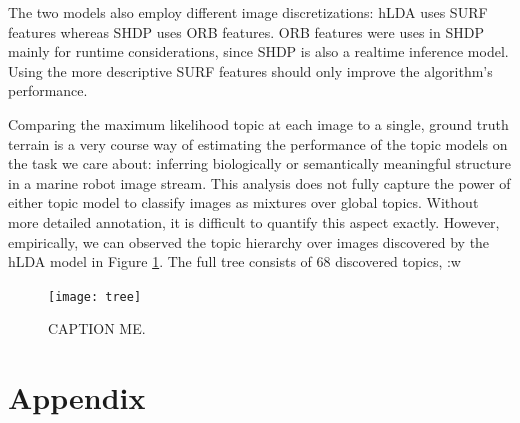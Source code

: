 \documentclass{article}
\begin{document}
The two models also employ different image discretizations: hLDA uses SURF features whereas SHDP uses ORB features. ORB features were uses in SHDP mainly for runtime considerations, since SHDP is also a realtime inference model. Using the more descriptive SURF features should only improve the algorithm's performance. 

Comparing the maximum likelihood topic at each image to a single, ground truth terrain is a very course way of estimating the performance of the topic models on the task we care about: inferring biologically or semantically meaningful structure in a marine robot image stream. This analysis does not fully capture the power of either topic model to classify images as mixtures over global topics. Without more detailed annotation, it is difficult to quantify this aspect exactly. However, empirically, we can observed the topic hierarchy over images discovered by the hLDA model in Figure \ref{fig:tree}. The full tree consists of 68 discovered topics, :w


\begin{figure}[h]
\centering
\texttt{[image: tree]}
\caption{CAPTION ME.}
    \label{fig:tree}
\end{figure}

\newpage


 \newpage
\section{Appendix}
\end{document}
